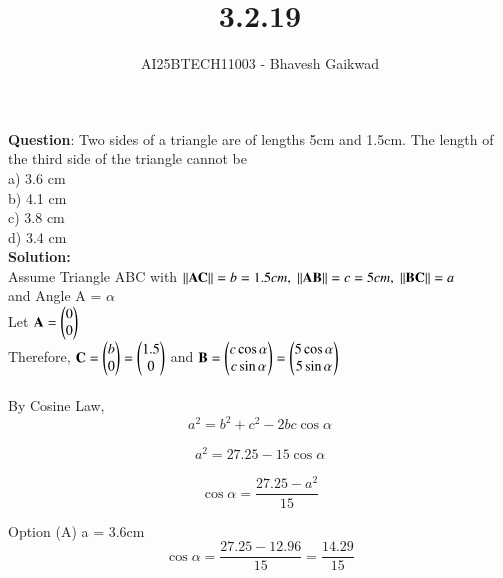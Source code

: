 \documentclass[journal]{IEEEtran}
\begin{document}

\vspace{3cm}

\title{3.2.19}
\author{AI25BTECH11003 - Bhavesh Gaikwad}
{\let\newpage\relax\maketitle}

\renewcommand{\thefigure}{\theenumi}
\renewcommand{\thetable}{\theenumi}
\setlength{\intextsep}{10pt} 


\renewcommand{\thetable}{\theenumi}


\textbf{Question}: Two sides of a triangle are of lengths 5cm and 1.5cm. The length of the third side of the triangle cannot be\\
a) 3.6 cm\\
b) 4.1 cm\\
c) 3.8 cm\\
d) 3.4 cm\\

\textbf{Solution:}\\
Assume Triangle ABC with $\left\lVert\mathbf{AC}\right\rVert = b = 1.5cm, \; \left\lVert\mathbf{AB}\right\rVert = c = 5cm, \; \left\lVert\mathbf{BC}\right\rVert = a$ \\
and Angle A = $\alpha$\\
Let $\mathbf{A} = \begin{pmatrix} 0 \\ 0\end{pmatrix}$\\
Therefore, $\mathbf{C} = \begin{pmatrix}b \\ 0\end{pmatrix} = \begin{pmatrix} 1.5 \\ 0\end{pmatrix}$ and $\mathbf{B} = \begin{pmatrix}c\cos\alpha \\ c\sin\alpha\end{pmatrix} = \begin{pmatrix}5\cos\alpha \\ 5\sin\alpha\end{pmatrix}$\\\\


By Cosine Law,
\begin{equation}
a^2 = b^2 + c^2 - 2bc\cos\alpha
\end{equation}

\begin{align}
a^2 = 27.25 - 15\cos\alpha
\end{align}

\begin{equation}
\cos\alpha = \frac{27.25 - a^2}{15}
\end{equation}

\newpage

Option (A) a = 3.6cm
\begin{equation}
    \cos\alpha = \dfrac{27.25 - 12.96}{15} = \dfrac{14.29}{15}
\end{equation}
\end{document}
